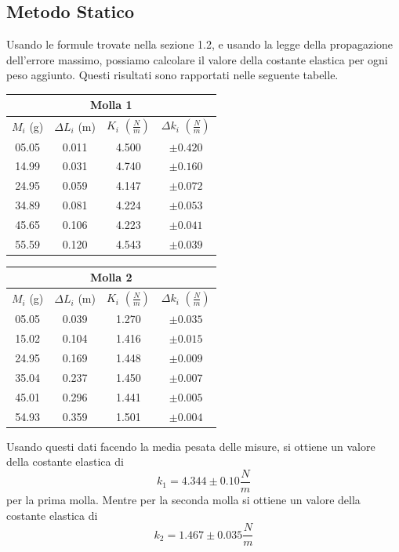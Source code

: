 \documentclass[a4paper]{article}
\begin{document}
{\subsection{Metodo Statico}
Usando le formule trovate nella sezione 1.2, e usando la legge della propagazione dell'errore massimo, possiamo calcolare il valore della costante elastica per ogni peso aggiunto. Questi risultati sono rapportati nelle seguente tabelle. 
\begin{table}[!ht]
    \centering
    \begin{tabular}{|c|c|c|c|}
    \hline
    \multicolumn{4}{|c|}{Molla 1} \\
    \hline
    $M_i$ (g) & $\Delta L_i$ (m) & $K_i$ $(\frac{N}{m})$ & $\Delta k_i$ $(\frac{N}{m})$ \\
    \hline
    05.05 & 0.011 & 4.500 & $\pm{0.420}$ \\
    14.99 & 0.031 & 4.740 & $\pm{0.160}$ \\
    24.95 & 0.059 & 4.147 & $\pm{0.072}$ \\
    34.89 & 0.081 & 4.224 & $\pm{0.053}$ \\
    45.65 & 0.106 & 4.223 & $\pm{0.041}$ \\
    55.59 & 0.120 & 4.543 & $\pm{0.039}$ \\
    \hline
    \end{tabular}
    \quad
    \begin{tabular}{|c|c|c|c|}
    \hline
    \multicolumn{4}{|c|}{Molla 2} \\
    \hline
    $M_i$ (g) & $\Delta L_i$ (m) & $K_i$ $(\frac{N}{m})$ & $\Delta k_i$ $(\frac{N}{m})$ \\
    \hline
    05.05 & 0.039 & 1.270 & $\pm{0.035}$ \\
    15.02 & 0.104 & 1.416 & $\pm{0.015}$ \\
    24.95 & 0.169 & 1.448 & $\pm{0.009}$ \\
    35.04 & 0.237 & 1.450 & $\pm{0.007}$ \\
    45.01 & 0.296 & 1.441 & $\pm{0.005}$ \\
    54.93 & 0.359 & 1.501 & $\pm{0.004}$ \\
    \hline
    \end{tabular}
\end{table}
Usando questi dati facendo la media pesata delle misure, si ottiene un valore della costante elastica di 
\begin{equation}
    k_1 = 4.344 \pm{0.10} \frac{N}{m}
\end{equation}
per la prima molla. Mentre per la seconda molla si ottiene un valore della costante elastica di 
\begin{equation}
    k_2 = 1.467 \pm{0.035} \frac{N}{m}
\end{equation}

}
\end{document}
